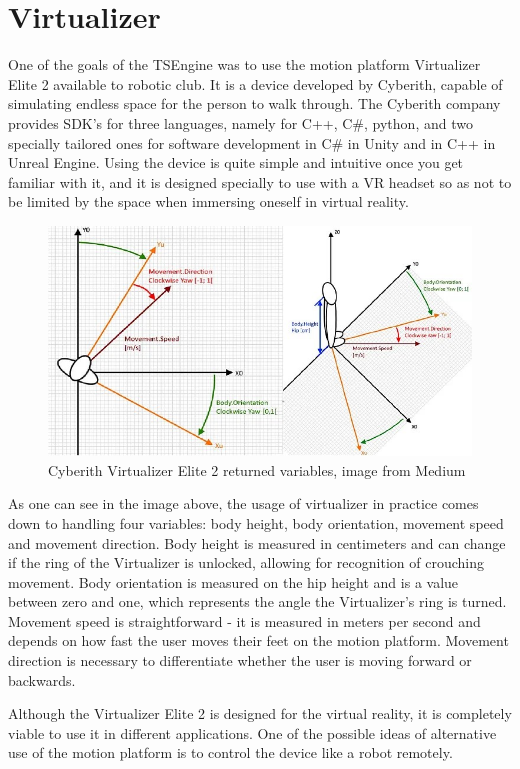 \newpage
\section{Virtualizer}
\label{sec:virtualizer}
\hspace{\parindent}
One of the goals of the TSEngine was to use the motion platform Virtualizer Elite 2 available to robotic club. It is a device developed by Cyberith, capable of simulating endless space for the person to walk through. The Cyberith company provides SDK's for three languages, namely for C++, C\#, python, and two specially tailored ones for software development in C\# in Unity and in C++ in Unreal Engine. Using the device is quite simple and intuitive once you get familiar with it, and it is designed specially to use with a VR headset so as not to be limited by the space when immersing oneself in virtual reality. 
\begin{figure}[H]
  \includegraphics[width=\linewidth]{figures/cyberith_variables.jpg}
  \caption{Cyberith Virtualizer Elite 2 returned variables, image from Medium\cite{virtualizer_variables}}
\end{figure}
As one can see in the image above, the usage of virtualizer in practice comes down to handling four variables: body height, body orientation, movement speed and movement direction. Body height is measured in centimeters and can change if the ring of the Virtualizer is unlocked, allowing for recognition of crouching movement. Body orientation is measured on the hip height and is a value between zero and one, which represents the angle the Virtualizer's ring is turned. Movement speed is straightforward - it is measured in meters per second and depends on how fast the user moves their feet on the motion platform. Movement direction is  necessary to differentiate whether the user is moving forward or backwards.

Although the Virtualizer Elite 2 is designed for the virtual reality, it is completely viable to use it in different applications. One of the possible ideas of alternative use of the motion platform is to control the device like a robot remotely.
